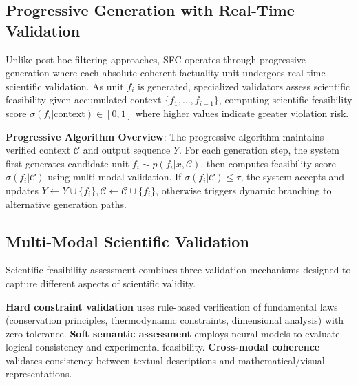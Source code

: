 \documentclass{uai2026} %
\theoremstyle{remark}
\theoremstyle{plain}
\theoremstyle{definition}
\begin{document}
\subsection{Progressive Generation with Real-Time Validation}
\vspace{-0.5\baselineskip}
Unlike post-hoc filtering approaches, SFC operates through progressive generation where each absolute-coherent-factuality unit undergoes real-time scientific validation. As unit $f_i$ is generated, specialized validators assess scientific feasibility given accumulated context $\{f_1, \ldots, f_{i-1}\}$, computing scientific feasibility score $\sigma(f_i | \text{context}) \in [0,1]$ where higher values indicate greater violation risk.

\textbf{Progressive Algorithm Overview}: The progressive algorithm maintains verified context $\mathcal{C}$ and output sequence $Y$. For each generation step, the system first generates candidate unit $f_i \sim p(f_i | x, \mathcal{C})$, then computes feasibility score $\sigma(f_i | \mathcal{C})$ using multi-modal validation. If $\sigma(f_i | \mathcal{C}) \leq \tau$, the system accepts and updates $Y \leftarrow Y \cup \{f_i\}, \mathcal{C} \leftarrow \mathcal{C} \cup \{f_i\}$, otherwise triggers dynamic branching to alternative generation paths.

\subsection{Multi-Modal Scientific Validation}

Scientific feasibility assessment combines three validation mechanisms designed to capture different aspects of scientific validity.

\textbf{Hard constraint validation} uses rule-based verification of fundamental laws (conservation principles, thermodynamic constraints, dimensional analysis) with zero tolerance. \textbf{Soft semantic assessment} employs neural models to evaluate logical consistency and experimental feasibility. \textbf{Cross-modal coherence} validates consistency between textual descriptions and mathematical/visual representations.
\end{document}
